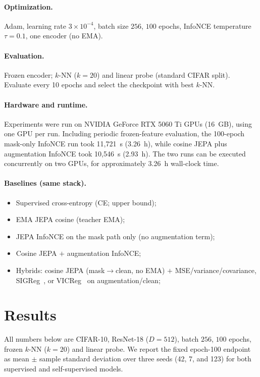 \documentclass[11pt,twocolumn]{article}
\begin{document}
\paragraph{Optimization.}
Adam, learning rate $3{\times}10^{-4}$, batch size $256$, $100$ epochs,
InfoNCE temperature $\tau{=}0.1$, one encoder (no EMA).

\paragraph{Evaluation.}
Frozen encoder; $k$-NN ($k{=}20$) and linear probe (standard CIFAR split).
Evaluate every 10 epochs and select the checkpoint with best $k$-NN.

\paragraph{Hardware and runtime.}
Experiments were run on NVIDIA GeForce RTX 5060 Ti GPUs (16~GB), using one GPU
per run. Including periodic frozen-feature evaluation, the 100-epoch mask-only
InfoNCE run took 11,721~s (3.26~h), while cosine JEPA plus augmentation InfoNCE
took 10,546~s (2.93~h). The two runs can be executed concurrently on two GPUs,
for approximately 3.26~h wall-clock time.

\paragraph{Baselines (same stack).}
\begin{itemize}
  \item Supervised cross-entropy (CE; upper bound);
  \item EMA JEPA cosine (teacher EMA);
  \item JEPA InfoNCE on the mask path only (no augmentation term);
  \item Cosine JEPA $+$ augmentation InfoNCE;
  \item Hybrids: cosine JEPA (mask$\rightarrow$clean, no EMA) $+$ MSE/variance/covariance,
        SIGReg~\citep{balestriero2025lejepa}, or
        VICReg~\citep{bardes2022vicreg} on augmentation/clean;
\end{itemize}





\section{Results}
\label{sec:results}

All numbers below are CIFAR-10, ResNet-18 ($D{=}512$), batch $256$, $100$ epochs,
frozen $k$-NN ($k{=}20$) and linear probe. We report the fixed epoch-100
endpoint as mean $\mathbin{\pm}$ sample standard deviation over three seeds
(42, 7, and 123) for both supervised and self-supervised models.
\end{document}
